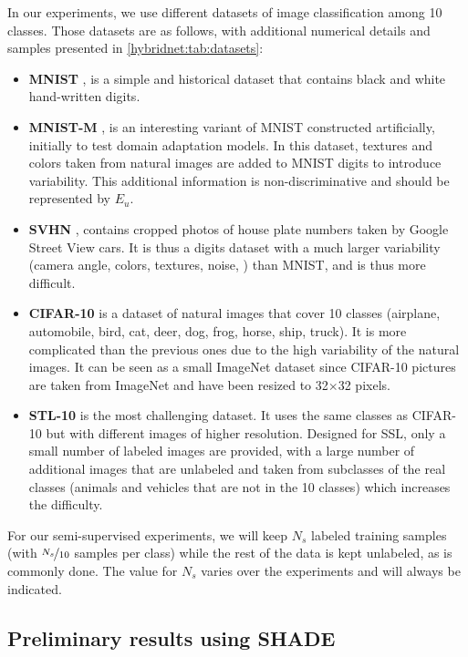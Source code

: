 In our experiments, we use different datasets of image classification among 10 classes. Those datasets are as follows, with additional numerical details and samples presented in \autoref{hybridnet:tab:datasets}:
\begin{itemize}
  \setlength\itemsep{0em}
  \item \textbf{MNIST} \citep{lecun}, is a simple and historical dataset that contains black and white hand-written digits.
  \item \textbf{MNIST-M} \citep{Ganin2015}, is an interesting variant of MNIST constructed artificially, initially to test domain adaptation models. In this dataset, textures and colors taken from natural images are added to MNIST digits to introduce variability. This additional information is non-discriminative and should be represented by $E_u$.
  \item \textbf{SVHN} \citep[Street View House Numbers, by][]{netzer2011reading}, contains cropped photos of house plate numbers taken by Google Street View cars. It is thus a digits dataset with a much larger variability (camera angle, colors, textures, noise, \etc) than MNIST, and is thus more difficult.
  \item \textbf{CIFAR-10} \citep{cifar10} is a dataset of natural images that cover 10 classes (airplane, automobile, bird, cat, deer, dog, frog, horse, ship, truck). It is more complicated than the previous ones due to the high variability of the natural images. It can be seen as a small ImageNet dataset since CIFAR-10 pictures are taken from ImageNet and have been resized to 32$\times$32 pixels.
  \item \textbf{STL-10} \citep{Coates2011} is the most challenging dataset. It uses the same classes as CIFAR-10 but with different images of higher resolution. Designed for \ac{SSL}, only a small number of labeled images are provided, with a large number of additional images that are unlabeled and taken from subclasses of the real classes (\eg animals and vehicles that are not in the 10 classes) which increases the difficulty.
\end{itemize}

For our semi-supervised experiments, we will keep $N_s$ labeled training samples (with $\nicefrac{N_s}{10}$ samples per class) while the rest of the data is kept unlabeled, as is commonly done. The value for $N_s$ varies over the experiments and will always be indicated.

\subsection{Preliminary results using SHADE}
\label{hybridnet:sec:exp_shade}


